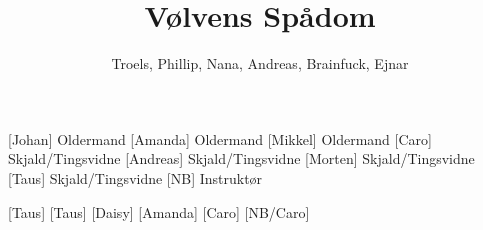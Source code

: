 \documentclass[a4paper,11pt]{article}
\title{Vølvens Spådom}
\author{Troels, Phillip, Nana, Andreas, Brainfuck, Ejnar}
\begin{document}
\maketitle

\begin{roles}
[Johan] Oldermand
[Amanda] Oldermand
[Mikkel] Oldermand
[Caro] Skjald/Tingsvidne
[Andreas] Skjald/Tingsvidne
[Morten] Skjald/Tingsvidne
[Taus] Skjald/Tingsvidne
[NB] Instruktør
\end{roles}

\begin{props}
  [Taus]
  [Taus]
  [Daisy]
  [Amanda]
  [Caro]
  [NB/Caro]
\end{props}
\end{document}

